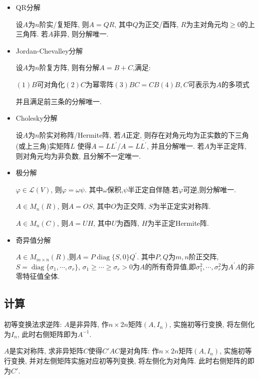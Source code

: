 \documentclass[UTF8]{ctexart}
\begin{document}
\begin{itemize}

\item QR分解\par 
设$A$为$n$阶实/复矩阵, 则$A=QR$, 其中$Q$为正交/酉阵, $R$为主对角元均$\geq 0$的上三角阵. 若$A$非异, 则分解唯一.

\item Jordan-Chevalley分解\par 
设$A$为$n$阶复方阵, 则有分解$A=B+C$,满足:\par 
$(1)$$B$可对角化\qquad $(2)$$C$为幂零阵\qquad $(3)$$BC=CB$\qquad $(4)$$B,C$可表示为$A$的多项式\par 
并且满足前三条的分解唯一.

\item Cholesky分解\par 
设$A$为$n$阶实对称阵/Hermite阵, 若$A$正定, 则存在对角元均为正实数的下三角(或上三角)实矩阵$L$
使得$A=LL^{\prime}$/$A=L\overline{L^{\prime}}$, 并且分解唯一.
若$A$为半正定阵, 则对角元均为非负数, 且分解不一定唯一.

\item 极分解\par 
$\varphi \in \mathcal{L}(V)$, 则$\varphi = \omega\psi$. 其中$\omega$保积,$\psi$半正定自伴随.若$\varphi $可逆,则分解唯一. \par 
$A\in M_n(R)$, 则$A=OS$, 其中$O$为正交阵, $S$为半正定实对称阵.\par 
$A\in M_n(C)$, 则$A=UH$, 其中$U$为酉阵, $H$为半正定Hermite阵.

\item 奇异值分解\par 
$A\in M_{m\times n}(R)$,则$A=P \operatorname{diag}\{S,0\}Q^{\prime}$.
其中$P,Q$为$m,n$阶正交阵,$S=\operatorname{diag}\{\sigma_1,\cdots ,\sigma_r\}$,
$\sigma_1\geq \cdots \geq \sigma_r>0$为$A$的所有奇异值,即$\sigma_1^2,\cdots,\sigma_r^2$为$A^{\prime}A$的非零特征值全体.

\end{itemize}


\subsection{计算}

初等变换法求逆阵: $A$是非异阵, 作$n\times 2n$矩阵$(A, I_n)$, 实施初等行变换,
将左侧化为$I_n$, 此时右侧矩阵即为$A^{-1}$.

$A$是实对称阵, 求非异矩阵$C$使得$C'AC$是对角阵: 
作$n\times 2n$矩阵$(A, I_n)$, 实施初等行变换, 并对左侧矩阵实施对应初等列变换,
将左侧化为对角阵. 此时右侧矩阵的即为$C'$.
\end{document}

